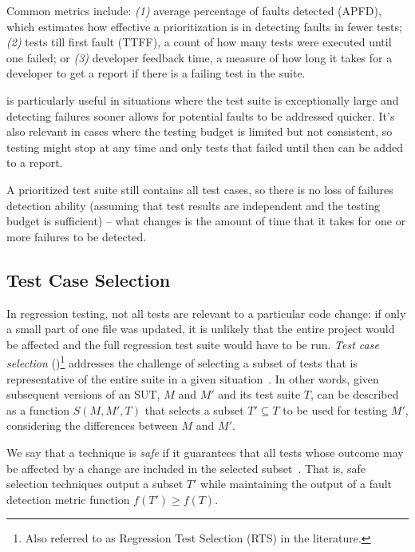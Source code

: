 Common metrics include: \textit{(1)} average percentage of faults detected (APFD), which estimates how effective a prioritization is in detecting faults in fewer tests; \textit{(2)} tests till first fault (TTFF), a count of how many tests were executed until one failed; or \textit{(3)} developer feedback time, a measure of how long it takes for a developer to get a report if there is a failing test in the suite.

\tcp is particularly useful in situations where the test suite is exceptionally large and detecting failures sooner allows for potential faults to be addressed quicker.
It's also relevant in cases where the testing budget is limited but not consistent, so testing might stop at any time and only tests that failed until then can be added to a report.

A prioritized test suite still contains all test cases, 
so there is no loss of failures detection ability (assuming that test results are independent and the testing budget is sufficient) -- what changes is the amount of time that it takes for one or more failures to be detected.


\subsection{Test Case Selection}
\label{sec:tcs}

In regression testing, not all tests are relevant to a particular code change:
if only a small part of one file was updated, it is unlikely that the entire project would be affected and the full regression test suite would have to be run.
\textit{Test case selection} (\tcs)\footnote{Also referred to as Regression Test Selection (RTS) in the literature.} addresses the challenge of selecting a subset of tests that is representative of the entire suite in a given situation~\cite{YooHarman10RegressionTestingSurvey, RothermelHarrold94FrameworkForEvaluationRTS}.
In other words, given subsequent versions of an SUT, $M$ and $M'$ and its test suite $T$, 
\tcs can be described as a function $S(M, M', T)$ that selects a subset $T' \subseteq T$ to be used for testing $M'$, considering the differences between $M$ and $M'$.

We say that a \tcs technique is \emph{safe} if it guarantees that all tests whose outcome may be affected by a change are included in the selected subset~\cite{RothermelHarrold94FrameworkForEvaluationRTS}.
That is, safe selection techniques output a subset $T'$ while maintaining the output of a fault detection metric function $f(T') \geq f(T)$.

